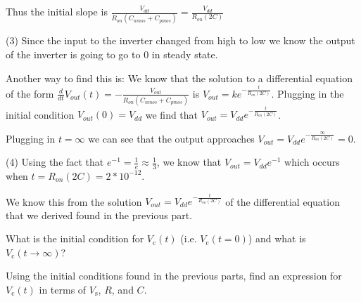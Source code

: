 \begin{enumerate}
{  Thus the initial slope is $\frac{V_{dd}}{R_{on}(C_{nmos} + C_{pmos})} = \frac{V_{dd}}{R_{on}(2C)}$

  (3) Since the input to the inverter changed from high to low we know the output of the inverter is going to go to $0$ in steady state.

  Another way to find this is: We know that the solution to a differential equation of the form $\frac{d}{dt}V_{out}(t) = - \frac{V_{out}}{R_{on}(C_{nmos} + C_{pmos})}$ is $V_{out} = ke^{-\frac{t}{R_{on}(2C)}}$.
  Plugging in the initial condition $V_{out}(0) = V_{dd}$ we find that $V_{out} = V_{dd}e^{-\frac{t}{R_{on}(2C)}}$.

  Plugging in $t = \infty$ we can see that the output approaches $V_{out} = V_{dd}e^{-\frac{\infty}{R_{on}(2C)}} = 0$.

  

  (4) Using the fact that $e^{-1} = \frac{1}{e} \approx \frac{1}{3}$, we know that $V_{out} = V_{dd}e^{-1}$ which occurs when $t = R_{on}(2C) = 2 * 10^{-12}$.

  We know this from the solution $V_{out} = V_{dd}e^{-\frac{t}{R_{on}(2C)}}$ of the differential equation that we derived found in the previous part.
}



\qitem What is the initial condition for $V_{\text{c}}(t)$ (i.e. $V_{\text{c}}(t=0)$) and what is $V_{\text{c}}(t \to \infty)$?





\qitem Using the initial conditions found in the previous parts, find an expression for $V_{\text{c}}(t)$ in terms of $V_{\text{s}}$, $R$, and $C$.


\end{enumerate}
